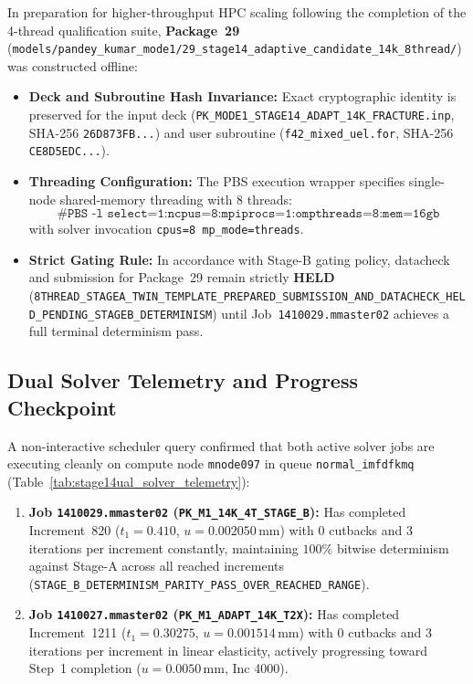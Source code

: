 In preparation for higher-throughput HPC scaling following the completion of the 4-thread qualification suite, \textbf{Package~29} (\texttt{models/pandey\_kumar\_mode1/29\_stage14\_adaptive\_candidate\_14k\_8thread/}) was constructed offline:
\begin{itemize}
  \item \textbf{Deck and Subroutine Hash Invariance:} Exact cryptographic identity is preserved for the input deck (\texttt{PK\_MODE1\_STAGE14\_ADAPT\_14K\_FRACTURE.inp}, SHA-256 \texttt{26D873FB...}) and user subroutine (\texttt{f42\_mixed\_uel.for}, SHA-256 \texttt{CE8D5EDC...}).
  \item \textbf{Threading Configuration:} The PBS execution wrapper specifies single-node shared-memory threading with 8 threads:
  \begin{equation}
    \texttt{\#PBS -l select=1:ncpus=8:mpiprocs=1:ompthreads=8:mem=16gb}
  \end{equation}
  with solver invocation \texttt{cpus=8 mp\_mode=threads}.
  \item \textbf{Strict Gating Rule:} In accordance with Stage-B gating policy, datacheck and submission for Package~29 remain strictly \textbf{HELD} (\texttt{8THREAD\_STAGEA\_TWIN\_TEMPLATE\_PREPARED\_\allowbreak SUBMISSION\_AND\_DATACHECK\_HELD\_PENDING\_STAGEB\_DETERMINISM}) until Job~\texttt{1410029.mmaster02} achieves a full terminal determinism pass.
\end{itemize}

\subsection{Dual Solver Telemetry and Progress Checkpoint}
\label{subsec:stage14ual_telemetry_checkpoint}

A non-interactive scheduler query confirmed that both active solver jobs are executing cleanly on compute node \texttt{mnode097} in queue \texttt{normal\_imfdfkmq} (Table~\ref{tab:stage14ual_solver_telemetry}):
\begin{enumerate}
  \item \textbf{Job \texttt{1410029.mmaster02} (\texttt{PK\_M1\_14K\_4T\_STAGE\_B}):} Has completed Increment~820 ($t_1 = 0.410$, $u = 0.002050\,\mathrm{mm}$) with 0 cutbacks and 3 iterations per increment constantly, maintaining $100\%$ bitwise determinism against Stage-A across all reached increments (\texttt{STAGE\_B\_DETERMINISM\_PARITY\_PASS\_OVER\_REACHED\_RANGE}).
  \item \textbf{Job \texttt{1410027.mmaster02} (\texttt{PK\_M1\_ADAPT\_14K\_T2X}):} Has completed Increment~1211 ($t_1 = 0.30275$, $u = 0.001514\,\mathrm{mm}$) with 0 cutbacks and 3 iterations per increment in linear elasticity, actively progressing toward Step~1 completion ($u = 0.0050\,\mathrm{mm}$, Inc 4000).
\end{enumerate}

